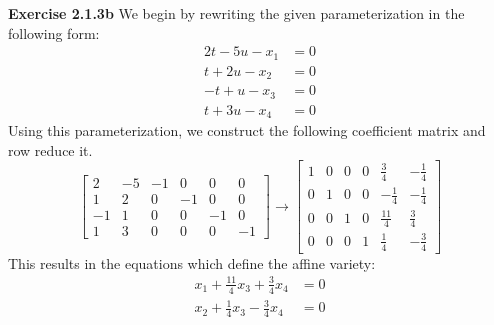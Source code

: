 \documentclass[12pt,oneside]{article}
\newenvironment{exercise}[1]{\vspace{.1in}\noindent\textbf{Exercise #1 \hspace{.05em}}}{}
\begin{document}

\begin{exercise}{2.1.3b}
    We begin by rewriting the given parameterization in the following form:
    \begin{align*}
        2t-5u-x_1   &=0\\
        t+2u-x_2    &=0\\
        -t+u-x_3    &=0\\
        t+3u-x_4    &=0
    \end{align*}
    Using this parameterization, we construct the following coefficient 
    matrix and row reduce it.
    \[
        \begin{bmatrix}
            2&-5&-1&0&0&0\\
            1&2&0&-1&0&0\\
            -1&1&0&0&-1&0\\
            1&3&0&0&0&-1
        \end{bmatrix}
        \rightarrow
        \begin{bmatrix}
            1&0&0&0&\frac{3}{4}&-\frac{1}{4}\\
            0&1&0&0&-\frac{1}{4}&-\frac{1}{4}\\
            0&0&1&0&\frac{11}{4}&\frac{3}{4}\\
            0&0&0&1&\frac{1}{4}&-\frac{3}{4}
        \end{bmatrix}
    \]
    This results in the equations which define the affine variety:
    \begin{align*}
        x_1 + \frac{11}{4}x_3+\frac{3}{4}x_4    &=0\\
        x_2+\frac{1}{4}x_3-\frac{3}{4}x_4       &=0
    \end{align*}
\end{exercise}

\end{document}
